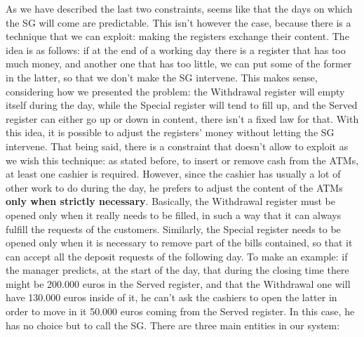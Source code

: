 \documentclass{article}
\begin{document}
As we have described the last two constraints, seems like that the days on which the SG will come are predictable. This isn't however the case, because there is a technique that we can exploit: making the registers exchange their content. The idea is as follows: if at the end of a working day there is a register that has too much money, and another one that has too little, we can put some of the former in the latter, so that we don't make the SG intervene. This makes sense, considering how we presented the problem: the Withdrawal register will empty itself during the day, while the Special register will tend to fill up, and the Served register can either go up or down in content, there isn't a fixed law for that. With this idea, it is possible to adjust the registers' money without letting the SG intervene. That being said, there is a constraint that doesn't allow to exploit as we wish this technique: as stated before, to insert or remove cash from the ATMs, at least one cashier is required. However, since the cashier has usually a lot of other work to do during the day, he prefers to adjust the content of the ATMs \textbf{only when strictly necessary}. Basically, the Withdrawal register must be opened only when it really needs to be filled, in such a way that it can always fulfill the requests of the customers. Similarly, the Special register needs to be opened only when it is necessary to remove part of the bills contained, so that it can accept all the deposit requests of the following day. To make an example: if the manager predicts, at the start of the day, that during the closing time there might be 200.000 euros in the Served register, and that the Withdrawal one will have 130.000 euros inside of it, he can't ask the cashiers to open the latter in order to move in it 50.000 euros coming from the Served register. In this case, he has no choice but to call the SG.
\newline
There are three main entities in our system:
\end{document}
